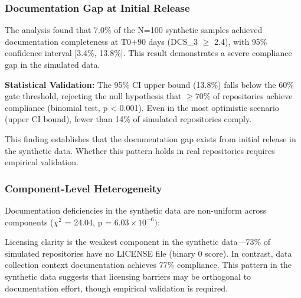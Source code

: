 
\subsubsection{Documentation Gap at Initial Release}

The analysis found that 7.0\% of the N=100 synthetic samples achieved documentation completeness at T0+90 days (DCS\_3 $\geq$ 2.4), with 95\% confidence interval [3.4\%, 13.8\%]. This result demonstrates a severe compliance gap in the simulated data.

\textbf{Statistical Validation:} The 95\% CI upper bound (13.8\%) falls below the 60\% gate threshold, rejecting the null hypothesis that $\geq 70$\% of repositories achieve compliance (binomial test, p < 0.001). Even in the most optimistic scenario (upper CI bound), fewer than 14\% of simulated repositories comply.

This finding establishes that the documentation gap exists from initial release in the synthetic data. Whether this pattern holds in real repositories requires empirical validation.

\subsubsection{Component-Level Heterogeneity}

Documentation deficiencies in the synthetic data are non-uniform across components ($\chi^2$ = 24.04, p = 6.$03\times 10^{-6})$:

\begin{table}[htbp]
\centering
{}
\end{table}

Licensing clarity is the weakest component in the synthetic data---73\% of simulated repositories have no LICENSE file (binary 0 score). In contrast, data collection context documentation achieves 77\% compliance. This pattern in the synthetic data suggests that licensing barriers may be orthogonal to documentation effort, though empirical validation is required.

